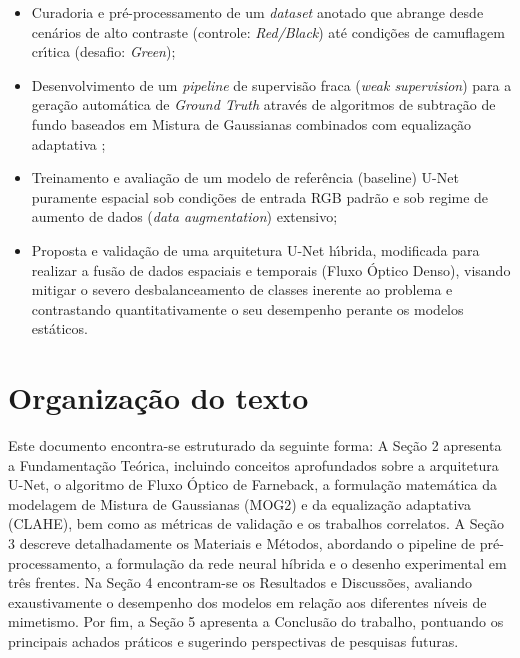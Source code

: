 \begin{itemize}
    \item Curadoria e pr\'e-processamento de um \textit{dataset} anotado que abrange desde cenários de alto contraste (controle: \textit{Red/Black}) até condições de camuflagem crı́tica (desafio: \textit{Green});

    \item Desenvolvimento de um \textit{pipeline} de supervis\~ao fraca (\textit{weak supervision}) para a geração automática de \textit{Ground Truth} através de algoritmos de subtração de fundo baseados em Mistura de Gaussianas \cite{Zivkovic2004} combinados com equaliza\c{c}\~ao adaptativa \cite{Zuiderveld1994ContrastLA};

    \item Treinamento e avaliação de um modelo de refer\^encia (baseline) U-Net puramente espacial sob condi\c{c}\~oes de entrada RGB padr\~ao e sob regime de aumento de dados (\textit{data augmentation}) extensivo;

    \item Proposta e validação de uma arquitetura U-Net hı́brida, modificada para realizar a fusão de dados espaciais e temporais (Fluxo Óptico Denso), visando mitigar o severo desbalanceamento de classes inerente ao problema e contrastando quantitativamente o seu desempenho perante os modelos est\'aticos.
\end{itemize}

\section{Organização do texto}

Este documento encontra-se estruturado da seguinte forma: 
A Seção 2 apresenta a Fundamentação Teórica, incluindo conceitos aprofundados sobre a arquitetura U-Net, o algoritmo de Fluxo Óptico de Farneback, a formulação matemática da modelagem de Mistura de Gaussianas (MOG2) e da equalização adaptativa (CLAHE), bem como as métricas de validação e os trabalhos correlatos. 
A Seção 3 descreve detalhadamente os Materiais e Métodos, abordando o pipeline de pré-processamento, a formulação da rede neural híbrida e o desenho experimental em três frentes. 
Na Seção 4 encontram-se os Resultados e Discussões, avaliando exaustivamente o desempenho dos modelos em relação aos diferentes níveis de mimetismo. 
Por fim, a Seção 5 apresenta a Conclusão do trabalho, pontuando os principais achados práticos e sugerindo perspectivas de pesquisas futuras.